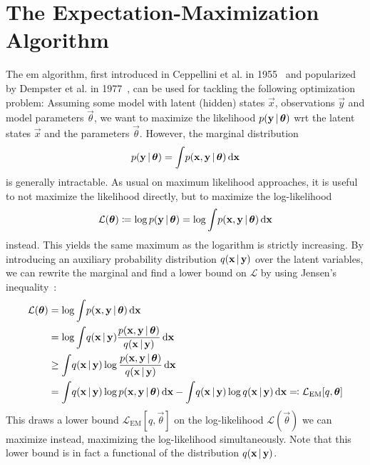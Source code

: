 	\section{The Expectation-Maximization Algorithm}
		The \ac{em} algorithm, first introduced in Ceppellini et al. in 1955~\cite{ceppelliniEstimationGeneFrequencies1955} and popularized by Dempster et al. in 1977~\cite{dempsterMaximumLikelihoodIncomplete1977}, can be used for tackling the following optimization problem: Assuming some model with latent (hidden) states \(\vec{x}\), observations \(\vec{y}\) and model parameters \(\vec{\theta}\), we want to maximize the likelihood \( p(\boldsymbol{\mathrm{y}} \,\vert\, \boldsymbol{\mathrm{\theta}}) \) \ac{wrt} the latent states \(\vec{x}\) and the parameters \(\vec{\theta}\). However, the marginal distribution
		\begin{align*}
			p(\boldsymbol{\mathrm{y}} \,\vert\, \boldsymbol{\mathrm{\theta}}) = \int\! p(\boldsymbol{\mathrm{x}}, \boldsymbol{\mathrm{y}} \,\vert\, \boldsymbol{\mathrm{\theta}}) \dd{\boldsymbol{\mathrm{x}}}
		\end{align*}
		is generally intractable. As usual on maximum likelihood approaches, it is useful to not maximize the likelihood directly, but to maximize the log-likelihood
		\begin{align*}
			\mathcal{L}(\boldsymbol{\mathrm{\theta}}) \coloneqq \log p(\boldsymbol{\mathrm{y}} \,\vert\, \boldsymbol{\mathrm{\theta}}) = \log \int\! p(\boldsymbol{\mathrm{x}}, \boldsymbol{\mathrm{y}} \,\vert\, \boldsymbol{\mathrm{\theta}}) \dd{\boldsymbol{\mathrm{x}}}
		\end{align*}
		instead. This yields the same maximum as the logarithm is strictly increasing. By introducing an auxiliary probability distribution \( q(\boldsymbol{\mathrm{x}} \,\vert\, \boldsymbol{\mathrm{y}}) \) over the latent variables, we can rewrite the marginal and find a lower bound on \(\mathcal{L}\) by using Jensen's inequality~\cite{jensenFonctionsConvexesInegalites1906}:
		\begin{align*}
			\mathcal{L}(\boldsymbol{\mathrm{\theta}})
				&= \log \int\! p(\boldsymbol{\mathrm{x}}, \boldsymbol{\mathrm{y}} \,\vert\, \boldsymbol{\mathrm{\theta}}) \dd{\boldsymbol{\mathrm{x}}} \\
				&= \log \int\! q(\boldsymbol{\mathrm{x}} \,\vert\, \boldsymbol{\mathrm{y}}) \frac{p(\boldsymbol{\mathrm{x}}, \boldsymbol{\mathrm{y}} \,\vert\, \boldsymbol{\mathrm{\theta}})}{q(\boldsymbol{\mathrm{x}} \,\vert\, \boldsymbol{\mathrm{y}})} \dd{\boldsymbol{\mathrm{x}}} \\
				&\geq \int\! q(\boldsymbol{\mathrm{x}} \,\vert\, \boldsymbol{\mathrm{y}}) \log \frac{p(\boldsymbol{\mathrm{x}}, \boldsymbol{\mathrm{y}} \,\vert\, \boldsymbol{\mathrm{\theta}})}{q(\boldsymbol{\mathrm{x}} \,\vert\, \boldsymbol{\mathrm{y}})} \dd{\boldsymbol{\mathrm{x}}} \\
				&= \int\! q(\boldsymbol{\mathrm{x}} \,\vert\, \boldsymbol{\mathrm{y}}) \log p(\boldsymbol{\mathrm{x}}, \boldsymbol{\mathrm{y}} \,\vert\, \boldsymbol{\mathrm{\theta}}) \dd{\boldsymbol{\mathrm{x}}} - \int\! q(\boldsymbol{\mathrm{x}} \,\vert\, \boldsymbol{\mathrm{y}}) \log q(\boldsymbol{\mathrm{x}} \,\vert\, \boldsymbol{\mathrm{y}}) \dd{\boldsymbol{\mathrm{x}}} \eqqcolon \mathcal{L}_\mathrm{EM}[q, \boldsymbol{\mathrm{\theta}}]
		\end{align*}
		This draws a lower bound \( \mathcal{L}_\mathrm{EM}[q, \vec{\theta}] \) on the log-likelihood \( \mathcal{L}(\vec{\theta}) \) we can maximize instead, maximizing the log-likelihood simultaneously. Note that this lower bound is in fact a functional of the distribution \( q(\boldsymbol{\mathrm{x}} \,\vert\, \boldsymbol{\mathrm{y}}) \).

